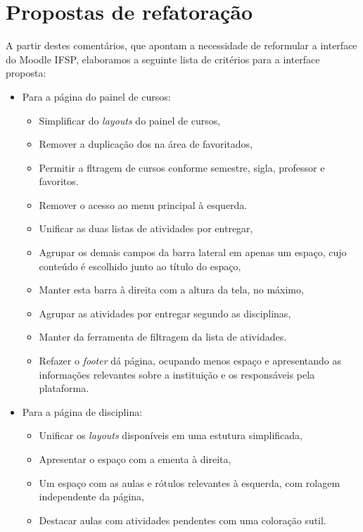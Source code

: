 \documentclass[11pt]{article}
\begin{document}
\section*{Propostas de refatoração}
\label{sec:orgdbe7f3a}
A partir destes comentários, que apontam a necessidade de
reformular a interface do Moodle IFSP, elaboramos a seguinte lista de
critérios para a interface proposta:

\begin{itemize}
\item Para a página do painel de cursos:
\begin{itemize}
\item Simplificar do \emph{layouts} do painel de cursos,
\item Remover a duplicação dos na área de favoritados,
\item Permitir a fltragem de cursos conforme semestre, sigla, professor e
favoritos.
\vspace{1em}

\item Remover o acesso ao menu principal à esquerda.
\vspace{1em}

\item Unificar as duas listas de atividades por entregar,
\item Agrupar os demais campos da barra lateral em apenas um espaço,
cujo conteúdo é escolhido junto ao título do espaço,
\item Manter esta barra à direita com a altura da tela, no máximo,
\item Agrupar as atividades por entregar segundo as disciplinas,
\item Manter da ferramenta de filtragem  da lista de atividades.
\vspace{1em}

\item Refazer o \emph{footer} dá página, ocupando menos espaço e apresentando
as informações relevantes sobre a instituição e os responsáveis
pela plataforma.
\vspace{1em}
\end{itemize}

\item Para a página de disciplina:
\begin{itemize}
\item Unificar os \emph{layouts} disponíveis em uma estutura simplificada,
\item Apresentar o espaço com a ementa à direita,
\item Um espaço com as aulas e rótulos relevantes à esquerda, com
rolagem independente da página,
\item Destacar aulas com atividades pendentes com uma coloração sutil.
\vspace{1em}
\end{itemize}


\end{itemize}
\end{document}
